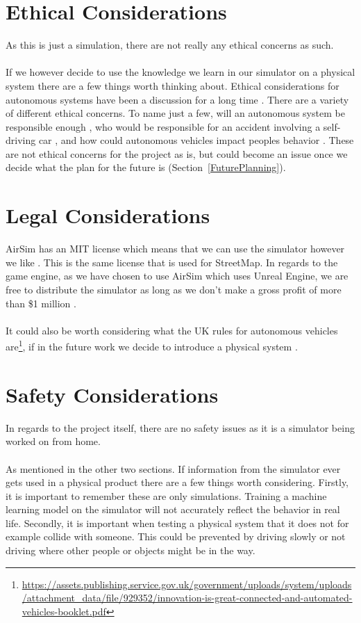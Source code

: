 \section{Ethical Considerations}
As this is just a simulation, there are not really any ethical concerns as such. 
\\~\\
If we however decide to use the knowledge we learn in our simulator on a physical system there are a few things worth thinking about. Ethical considerations for autonomous systems have been a discussion for a long time \cite{ArkinRonaldC2016EaAS, BorensteinJason2019SCaE}. There are a variety of different ethical concerns. To name just a few, will an autonomous system be responsible enough \cite{BorensteinJason2019SCaE}, who would be responsible for an accident involving a self-driving car \cite{Hevelke2015, EthicsIssue}, and how could autonomous vehicles impact peoples behavior \cite{moralComputers}. These are not ethical concerns for the project as is, but could become an issue once we decide what the plan for the future is (Section~\ref{FuturePlanning}). 

\section{Legal Considerations}
AirSim has an MIT license which means that we can use the simulator however we like \cite{MITLicense}. This is the same license that is used for StreetMap. In regards to the game engine, as we have chosen to use AirSim which uses Unreal Engine, we are free to distribute the simulator as long as we don't make a gross profit of more than \$1 million \cite{UE5}. 
\\~\\
It could also be worth considering what the UK rules for autonomous vehicles are\footnote{\url{https://assets.publishing.service.gov.uk/government/uploads/system/uploads/attachment_data/file/929352/innovation-is-great-connected-and-automated-vehicles-booklet.pdf}}, if in the future work we decide to introduce a physical system \cite{UKAutoRules, UKAutoRulesGov2}. 


\section{Safety Considerations}
In regards to the project itself, there are no safety issues as it is a simulator being worked on from home. 
\\~\\
As mentioned in the other two sections. If information from the simulator ever gets used in a physical product there are a few things worth considering. Firstly, it is important to remember these are only simulations. Training a machine learning model on the simulator will not accurately reflect the behavior in real life. Secondly, it is important when testing a physical system that it does not for example collide with someone. This could be prevented by driving slowly or not driving where other people or objects might be in the way.